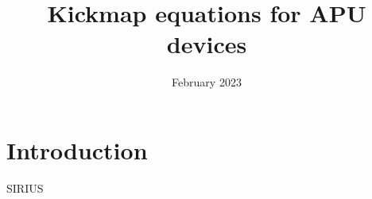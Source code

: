 \documentclass{article}
\title{Kickmap equations for APU devices}
\author{}
\date{February 2023}
\begin{document}
\maketitle

\section{Introduction}
SIRIUS 
\end{document}
